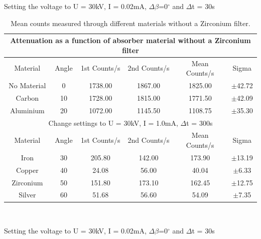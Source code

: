 \documentclass[12pt]{article}
\begin{document}
Setting the voltage to U = 30kV, I = 0.02mA, $\Delta \beta$=0$^{\circ}$ and $\Delta$t = 30s \cite{Exp.D-2020}

\begin{table}[H]
\begin{center}
 \footnotesize
 \begin{tabular}{|c||c||c|c||c|c|}
 \hline
 \multicolumn{6}{|c|}{Attenuation as a function of absorber material without a Zirconium filter} \\
 \hline 
 Material & Angle & 1st Counts/s & 2nd Counts/s & Mean Counts/s & Sigma\\
 \hline \hline
  No Material & 0 & 1738.00 & 1867.00 & 1825.00 & $\pm$42.72 \\
 \hline
  Carbon & 10 & 1728.00 & 1815.00 & 1771.50 & $\pm$42.09 \\
 \hline 
  Aluminium & 20 & 1072.00 & 1145.50 & 1108.75 & $\pm$35.30 \\
 \hline \hline
 \multicolumn{6}{|c|}{ Change settings to U = 30kV, I = 1.0mA, $\Delta$t = 300s} \\
  \hline 
  Material & Angle & 1st Counts/s & 2nd Counts/s & Mean Counts/s & Sigma\\
 \hline \hline
  Iron & 30 & 205.80 & 142.00 & 173.90 & $\pm$13.19 \\
 \hline
  Copper & 40 & 24.08 & 56.00 & 40.04 & $\pm$6.33 \\
 \hline 
  Zirconium & 50 & 151.80 & 173.10 & 162.45 & $\pm$12.75\\
 \hline 
  Silver & 60 & 51.68 & 56.60 & 54.09 & $\pm$7.35 \\
 \hline 
 \end{tabular} \\ 
 \caption{Mean counts measured through different materials without a Zirconium filter.}
 \label{Material No Filter}
\end{center}
\end{table}

Setting the voltage to U = 30kV, I = 0.02mA, $\Delta \beta$=0$^{\circ}$ and $\Delta$t = 30s \cite{Exp.D-2020}
\end{document}
